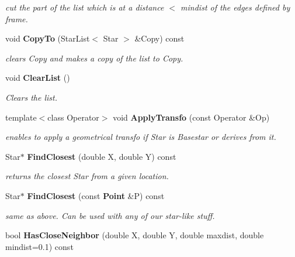 \begin{CompactItemize}
\begin{CompactList}\small\item\em cut the part of the list which is at a distance $<$ mindist of the edges defined by frame.\item\end{CompactList}\item 
{}
void {\bf Copy\-To} (Star\-List$<$ Star $>$ \&Copy) const\label{class_starlist_a13}

\begin{CompactList}\small\item\em clears Copy and makes a copy of the list to Copy.\item\end{CompactList}\item 
{}
void {\bf Clear\-List} ()\label{class_starlist_a14}

\begin{CompactList}\small\item\em Clears the list.\item\end{CompactList}\item 
template$<$class Operator$>$ void {\bf Apply\-Transfo} (const Operator \&Op)
\begin{CompactList}\small\item\em enables to apply a geometrical transfo if Star is Basestar or derives from it.\item\end{CompactList}\item 
{}
Star$\ast$ {\bf Find\-Closest} (double X, double Y) const\label{class_starlist_a16}

\begin{CompactList}\small\item\em returns the closest Star from a given location.\item\end{CompactList}\item 
{}
Star$\ast$ {\bf Find\-Closest} (const {\bf Point} \&P) const\label{class_starlist_a17}

\begin{CompactList}\small\item\em same as above. Can be used with any of our star-like stuff.\item\end{CompactList}\item 
{}
bool {\bf Has\-Close\-Neighbor} (double X, double Y, double maxdist, double mindist=0.1) const\label{class_starlist_a18}


\end{CompactItemize}
